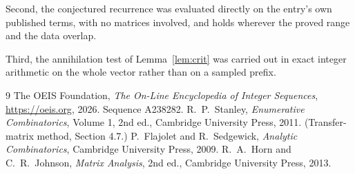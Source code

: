 \documentclass[11pt,a4paper]{article}
\theoremstyle{plain}
\theoremstyle{definition}
\begin{document}
Second, the conjectured recurrence was evaluated directly on the entry's own published terms,
with no matrices involved, and holds wherever the proved range and the data overlap.

Third, the annihilation test of Lemma~\ref{lem:crit} was carried out in exact integer
arithmetic on the whole vector rather than on a sampled prefix.

\begin{thebibliography}{9}
 The OEIS Foundation, \emph{The On-Line Encyclopedia of Integer
Sequences}, \url{https://oeis.org}, 2026. Sequence A238282.
 R.~P.~Stanley, \emph{Enumerative Combinatorics}, Volume 1, 2nd ed.,
Cambridge University Press, 2011. (Transfer-matrix method, Section 4.7.)
 P.~Flajolet and R.~Sedgewick, \emph{Analytic Combinatorics}, Cambridge
University Press, 2009.
 R.~A.~Horn and C.~R.~Johnson, \emph{Matrix Analysis}, 2nd ed., Cambridge
University Press, 2013.
\end{thebibliography}
\end{document}
